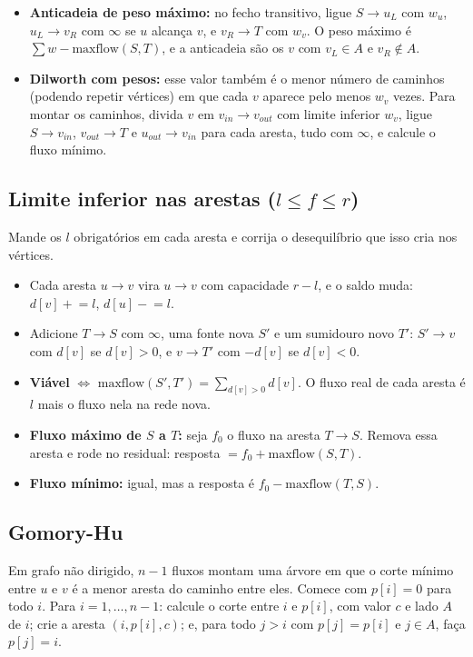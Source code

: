 \begin{itemize}
  \item \textbf{Anticadeia de peso máximo:} no fecho transitivo, ligue $S \to u_L$ com $w_u$, $u_L \to v_R$ com
        $\infty$ se $u$ alcança $v$, e $v_R \to T$ com $w_v$. O peso máximo é $\sum w - \text{maxflow}(S, T)$, e a
        anticadeia são os $v$ com $v_L \in A$ e $v_R \notin A$.
  \item \textbf{Dilworth com pesos:} esse valor também é o menor número de caminhos (podendo repetir vértices) em que
        cada $v$ aparece pelo menos $w_v$ vezes. Para montar os caminhos, divida $v$ em $v_{in} \to v_{out}$ com
        limite inferior $w_v$, ligue $S \to v_{in}$, $v_{out} \to T$ e $u_{out} \to v_{in}$ para cada aresta, tudo com
        $\infty$, e calcule o fluxo mínimo.
\end{itemize}

\subsection*{Limite inferior nas arestas ($l \le f \le r$)}

Mande os $l$ obrigatórios em cada aresta e corrija o desequilíbrio que isso cria nos vértices.
\begin{itemize}
  \item Cada aresta $u \to v$ vira $u \to v$ com capacidade $r - l$, e o saldo muda: $d[v] \mathrel{+}= l$, $d[u] \mathrel{-}= l$.
  \item Adicione $T \to S$ com $\infty$, uma fonte nova $S'$ e um sumidouro novo $T'$: $S' \to v$ com $d[v]$ se $d[v] > 0$,
        e $v \to T'$ com $-d[v]$ se $d[v] < 0$.
  \item \textbf{Viável} $\iff$ $\text{maxflow}(S', T') = \sum_{d[v] > 0} d[v]$. O fluxo real de cada aresta é $l$ mais o fluxo
        nela na rede nova.
  \item \textbf{Fluxo máximo de $S$ a $T$:} seja $f_0$ o fluxo na aresta $T \to S$. Remova essa aresta e rode no residual:
        resposta $= f_0 + \text{maxflow}(S, T)$.
  \item \textbf{Fluxo mínimo:} igual, mas a resposta é $f_0 - \text{maxflow}(T, S)$.
\end{itemize}

\subsection*{Gomory-Hu}

Em grafo não dirigido, $n - 1$ fluxos montam uma árvore em que o corte mínimo entre $u$ e $v$ é a menor aresta do
caminho entre eles. Comece com $p[i] = 0$ para todo $i$. Para $i = 1, \dots, n - 1$: calcule o corte entre $i$ e
$p[i]$, com valor $c$ e lado $A$ de $i$; crie a aresta $(i, p[i], c)$; e, para todo $j > i$ com $p[j] = p[i]$ e
$j \in A$, faça $p[j] = i$.
